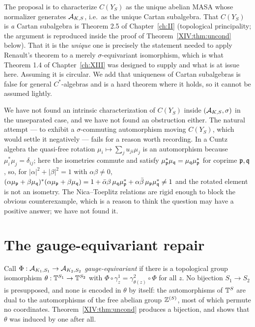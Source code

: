 \begin{remark}[Property B]\label{XIV:rem:B}
The proposal is to characterize $C(Y_S)$ as the unique abelian MASA whose normalizer
generates $\mathcal{A}_{K,S}$, i.e.\ as the unique Cartan subalgebra. That $C(Y_S)$ is \emph{a}
Cartan subalgebra is Theorem 2.5 of Chapter~\ref{ch:II} (topological principality; the
argument is reproduced inside the proof of Theorem~\ref{XIV:thm:uncond} below). That it is the
\emph{unique} one is precisely the statement needed to apply Renault's theorem \cite{Renault}
to a merely $\sigma$-equivariant isomorphism,
which is what Theorem 1.4 of Chapter~\ref{ch:XIII} was designed to supply and what is at issue here.
Assuming it is circular. We add that uniqueness of Cartan subalgebras is false for general
$C^*$-algebras and is a hard theorem where it holds, so it cannot be assumed lightly.
\end{remark}

\begin{remark}\label{XIV:rem:open}
We have not found an intrinsic characterization of $C(Y_S)$ inside $(\mathcal{A}_{K,S},\sigma)$ in the
unseparated case, and we have not found an obstruction either. The natural attempt --- to
exhibit a $\sigma$-commuting automorphism moving $C(Y_S)$, which would settle it negatively
--- fails for a reason worth recording. In a Cuntz algebra the quasi-free rotation
$\mu_i\mapsto\sum_ju_{ji}\mu_j$ is an automorphism because $\mu_i^*\mu_j=\delta_{ij}$; here
the isometries commute and satisfy $\mu_{\mathfrak{p}}^*\mu_{\mathfrak{q}}=\mu_{\mathfrak{q}}\mu_{\mathfrak{p}}^*$ for coprime
$\mathfrak{p},\mathfrak{q}$, so, for $|\alpha|^2+|\beta|^2=1$ with $\alpha\beta\ne0$,
$(\alpha\mu_{\mathfrak{p}}+\beta\mu_{\mathfrak{q}})^*(\alpha\mu_{\mathfrak{p}}+\beta\mu_{\mathfrak{q}})=1+\bar\alpha\beta\,\mu_{\mathfrak{q}}\mu_{\mathfrak{p}}^*+\alpha\bar\beta\,\mu_{\mathfrak{p}}\mu_{\mathfrak{q}}^*\ne1$
and the rotated element is not an isometry. The Nica--Toeplitz relations are rigid enough to
block the obvious counterexample, which is a reason to think the question may have a positive
answer; we have not found it.
\end{remark}

\section{The gauge-equivariant repair}

\begin{definition}\label{XIV:def:gaugeequiv}
Call $\Phi:\mathcal{A}_{K_1,S_1}\to\mathcal{A}_{K_2,S_2}$ \emph{gauge-equivariant} if there is a topological
group isomorphism $\theta:\mathbb{T}^{S_1}\to\mathbb{T}^{S_2}$ with
$\Phi\circ\gamma^1_z=\gamma^2_{\theta(z)}\circ\Phi$ for all $z$. No bijection $S_1\to S_2$ is
presupposed, and none is encoded in $\theta$ by itself: the automorphisms of $\mathbb{T}^{S}$ are
dual to the automorphisms of the free abelian group $\mathbb{Z}^{(S)}$, most of which permute no
coordinates. Theorem~\ref{XIV:thm:uncond} produces a bijection, and shows that $\theta$ was
induced by one after all.
\end{definition}

